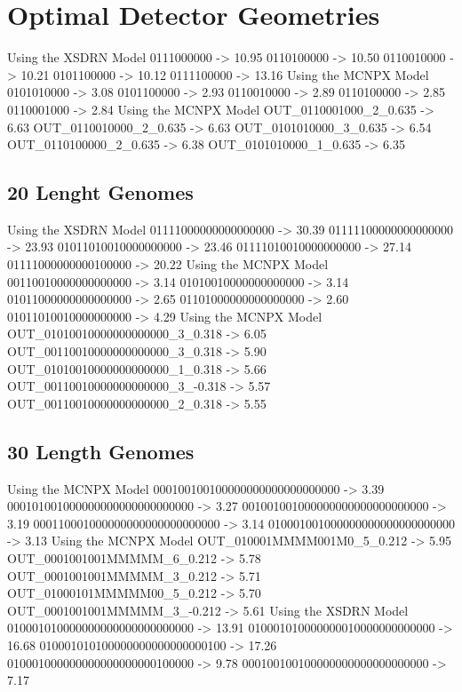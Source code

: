 \section{Optimal Detector Geometries}

Using the XSDRN Model
0111000000 -> 10.95
0110100000 -> 10.50
0110010000 -> 10.21
0101100000 -> 10.12
0111100000 -> 13.16
Using the MCNPX Model
0101010000 ->  3.08
0101100000 ->  2.93
0110010000 ->  2.89
0110100000 ->  2.85
0110001000 ->  2.84
Using the MCNPX Model
OUT_0110001000_2_0.635 ->  6.63
OUT_0110010000_2_0.635 ->  6.63
OUT_0101010000_3_0.635 ->  6.54
OUT_0110100000_2_0.635 ->  6.38
OUT_0101010000_1_0.635 ->  6.35

\subsection{20 Lenght Genomes}
Using the XSDRN Model
01111000000000000000 -> 30.39
01111100000000000000 -> 23.93
01011010010000000000 -> 23.46
01111010010000000000 -> 27.14
01111000000000100000 -> 20.22
Using the MCNPX Model
00110010000000000000 ->  3.14
01010010000000000000 ->  3.14
01011000000000000000 ->  2.65
01101000000000000000 ->  2.60
01011010010000000000 ->  4.29
Using the MCNPX Model
OUT_01010010000000000000_3_0.318 ->  6.05
OUT_00110010000000000000_3_0.318 ->  5.90
OUT_01010010000000000000_1_0.318 ->  5.66
OUT_00110010000000000000_3_-0.318 ->  5.57
OUT_00110010000000000000_2_0.318 ->  5.55

\subsection{30 Length Genomes}
Using the MCNPX Model
000100100100000000000000000000 ->  3.39
000101001000000000000000000000 ->  3.27
001001001000000000000000000000 ->  3.19
000110001000000000000000000000 ->  3.14
010001001000000000000000000000 ->  3.13
Using the MCNPX Model
OUT_010001MMMM001M0_5_0.212 ->  5.95
OUT_0001001001MMMMM_6_0.212 ->  5.78
OUT_0001001001MMMMM_3_0.212 ->  5.71
OUT_01000101MMMMM00_5_0.212 ->  5.70
OUT_0001001001MMMMM_3_-0.212 ->  5.61
Using the XSDRN Model
010001010000000000000000000000 -> 13.91
010001010000000010000000000000 -> 16.68
010001010100000000000000000100 -> 17.26
010001000000000000000000100000 ->  9.78
000100100100000000000000000000 ->  7.17
